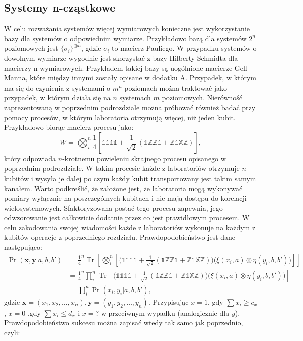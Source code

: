 \documentclass[10pt]{article} %
\DeclareMathOperator{\Trs}{Tr}
\newcommand{\X}{\mathbb{X}}
\newcommand{\Z}{\mathbb{Z}}
\newcommand{\I}{\mathbb{1}}
\begin{document}
\subsection{Systemy n-cząstkowe}
W celu rozważania systemów więcej wymiarowych konieczne jest wykorzystanie bazy dla systemów o odpowiednim wymiarze. Przykładowo bazą dla systemów
$2^n$ poziomowych jest $\{ \sigma_i \}^{\otimes n}$, gdzie $\sigma_i$ to macierz Pauliego. W przypadku systemów o dowolnym wymiarze wygodnie jest
skorzystać z bazy Hilberty-Schmidta dla macierzy n-wymiarowych. Przykładem takiej bazy są uogólnione macierze Gell-Manna, które między innymi zostały opisane
w dodatku A. Przypadek, w którym ma się do czynienia z systemami o $m^n$ poziomach można traktować jako przypadek, w którym działa się na $n$ systemach
$m$ poziomowych. Nierówność zaprezentowaną w poprzednim podrozdziale można próbować również badać przy pomocy procesów, w którym laboratoria otrzymują więcej, niż jeden kubit. Przykładowo biorąc macierz procesu jako:
\begin{equation}
W =  \bigotimes_i^{n}\frac{1}{4}\left[ \I\I\I\I + \frac{1}{\sqrt{2}}\left( \I\Z\Z\I + \Z\I\X\Z \right) \right],
\end{equation} który odpowiada $n$-krotnemu powieleniu skrajnego procesu opisanego w poprzednim podrozdziale. W takim procesie każde z laboratoriów otrzymuje
$n$ kubitów i wysyła je dalej po czym każdy kubit transportowany jest takim samym kanałem. Warto podkreślić, że założone jest, że laboratoria mogą wykonywać pomiary wyłącznie na poszczególnych kubitach i nie mają dostępu do korelacji wielosystemowych. 
Sfaktoryzowana postać tego procesu zapewnia, jego odwzorowanie jest całkowicie dodatnie przez co jest prawidłowym procesem.
W celu zakodowania swojej wiadomości każde z laboratoriów wykonuje na każdym z kubitów operacje z poprzedniego rozdziału. Prawdopodobieństwo jest dane następująco:
\begin{equation}
\begin{split}
\Pr(\mathbf{x}, \mathbf{y} | a, b, b') &= \frac{1}{4}^n\Trs \left[ \bigotimes_i^{n}\left[\Big( \I\I\I\I + \frac{1}{\sqrt{2}} \left( \I\Z\Z\I + \Z\I\X\Z\right)\Big)\Big(\xi(x_i,a) \otimes \eta(y_i, b, b')\Big)\right]\right] \\
&= \frac{1}{4}^n \prod_i^n \Trs\left[ \Big( \I\I\I\I  + \frac{1}{\sqrt{2}} \left( \I\Z\Z\I + \Z\I\X\Z\right)\Big) \Big( \xi(x_i,a) \otimes \eta(y_i, b, b')\Big) \right] \\
&= \prod_i^n \Pr(x_i,y_i |a, b, b'),
\end{split}
\end{equation} gdzie $\mathbf{x} = (x_1, x_2,\dots,x_n), \mathbf{y} = (y_1, y_2, \dots, y_n)$. Przypisując $x=1$, gdy $\sum x_i \geq c_x$, $x=0$  ,gdy $\sum x_i \leq d_x$ i $x=?$ w przeciwnym wypadku (analogicznie dla $y$). Prawdopodobieństwo sukcesu można zapisać wtedy tak samo jak poprzednio, czyli:
\end{document}
